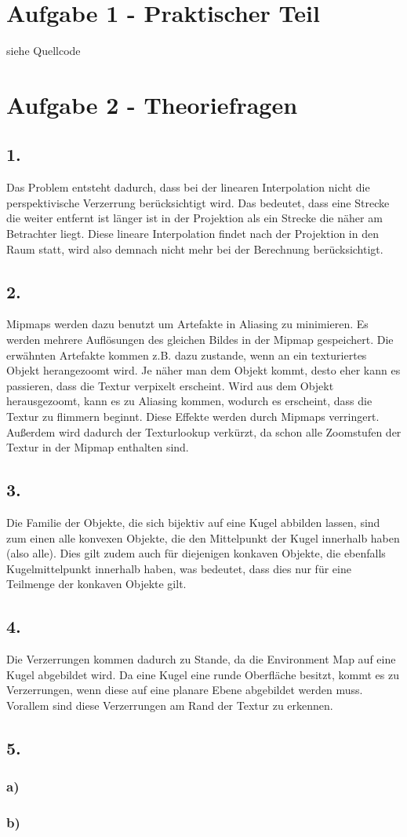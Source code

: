 \documentclass[12pt]{scrreprt}
\begin{document}


\chapter*{Aufgabe 1 - Praktischer Teil}

siehe Quellcode

\chapter*{Aufgabe 2 - Theoriefragen}
\section*{1.}
Das Problem entsteht dadurch, dass bei der linearen Interpolation nicht die perspektivische Verzerrung berücksichtigt wird. Das bedeutet, dass eine Strecke die weiter entfernt ist länger ist in der Projektion als ein Strecke die näher am Betrachter liegt. 
Diese lineare Interpolation findet nach der Projektion in den Raum statt, wird also demnach nicht mehr bei der Berechnung berücksichtigt.
\section*{2.}
Mipmaps werden dazu benutzt um Artefakte in Aliasing zu minimieren. Es werden mehrere Auflösungen des gleichen Bildes in der Mipmap gespeichert. Die erwähnten Artefakte kommen z.B. dazu zustande, wenn an ein texturiertes Objekt herangezoomt wird. Je näher man dem Objekt kommt, desto eher kann es passieren, dass die Textur verpixelt erscheint. Wird aus dem Objekt herausgezoomt, kann es zu Aliasing kommen, wodurch es erscheint, dass die Textur zu flimmern beginnt. Diese Effekte werden durch Mipmaps verringert. Außerdem wird dadurch der Texturlookup verkürzt, da schon alle Zoomstufen der Textur in der Mipmap enthalten sind.
\section*{3.}
Die Familie der Objekte, die sich bijektiv auf eine Kugel abbilden lassen, sind zum einen alle konvexen Objekte, die den Mittelpunkt der Kugel innerhalb haben (also alle). Dies gilt zudem auch für diejenigen konkaven Objekte, die ebenfalls Kugelmittelpunkt innerhalb haben, was bedeutet, dass dies nur für eine Teilmenge der konkaven Objekte gilt.
\section*{4.}
Die Verzerrungen kommen dadurch zu Stande, da die Environment Map auf eine Kugel abgebildet wird. Da eine Kugel eine runde Oberfläche besitzt, kommt es zu Verzerrungen, wenn diese auf eine planare Ebene abgebildet werden muss. Vorallem sind diese Verzerrungen am Rand der Textur zu erkennen.
\section*{5.}
\subsection*{a)}
\subsection*{b)}
\end{document}
